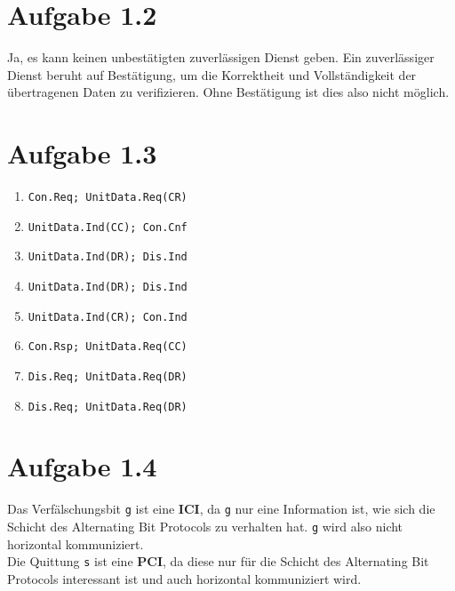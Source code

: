 \documentclass[12pt, a4paper]{article}
\begin{document}
\newpage


\section*{Aufgabe 1.2}
Ja, es kann keinen unbestätigten zuverlässigen Dienst geben. Ein zuverlässiger Dienst beruht auf Bestätigung, um die Korrektheit und Vollständigkeit der übertragenen Daten zu verifizieren. Ohne Bestätigung ist dies also nicht möglich.





\section*{Aufgabe 1.3}
\begin{enumerate}[label=(\arabic*)]
	\item \verb|Con.Req; UnitData.Req(CR)|
	\item \verb|UnitData.Ind(CC); Con.Cnf|
	\item \verb|UnitData.Ind(DR); Dis.Ind|
	\item \verb|UnitData.Ind(DR); Dis.Ind|
	\item \verb|UnitData.Ind(CR); Con.Ind|
	\item \verb|Con.Rsp; UnitData.Req(CC)|
	\item \verb|Dis.Req; UnitData.Req(DR)|
	\item \verb|Dis.Req; UnitData.Req(DR)|
\end{enumerate}





\section*{Aufgabe 1.4}
Das Verfälschungsbit \verb|g| ist eine \textbf{ICI}, da \verb|g| nur eine Information ist, wie sich die Schicht des Alternating Bit Protocols zu verhalten hat. \verb|g| wird also nicht horizontal kommuniziert.\\
Die Quittung \verb|s| ist eine \textbf{PCI}, da diese nur für die Schicht des Alternating Bit Protocols interessant ist und auch horizontal kommuniziert wird.


\newpage
\end{document}

